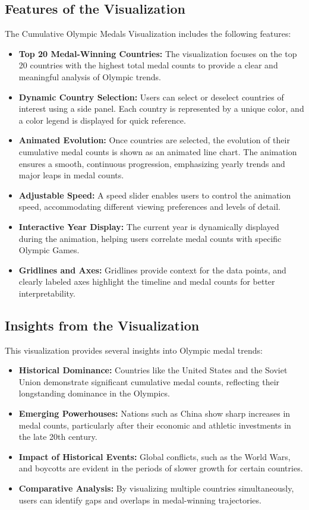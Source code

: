 \subsection{Features of the Visualization}
The Cumulative Olympic Medals Visualization includes the following features:
\begin{itemize}
    \item \textbf{Top 20 Medal-Winning Countries:} The visualization focuses on the top 20 countries with the highest total medal counts to provide a clear and meaningful analysis of Olympic trends.
    \item \textbf{Dynamic Country Selection:} Users can select or deselect countries of interest using a side panel. Each country is represented by a unique color, and a color legend is displayed for quick reference.
    \item \textbf{Animated Evolution:} Once countries are selected, the evolution of their cumulative medal counts is shown as an animated line chart. The animation ensures a smooth, continuous progression, emphasizing yearly trends and major leaps in medal counts.
    \item \textbf{Adjustable Speed:} A speed slider enables users to control the animation speed, accommodating different viewing preferences and levels of detail.
    \item \textbf{Interactive Year Display:} The current year is dynamically displayed during the animation, helping users correlate medal counts with specific Olympic Games.
    \item \textbf{Gridlines and Axes:} Gridlines provide context for the data points, and clearly labeled axes highlight the timeline and medal counts for better interpretability.
\end{itemize}

\subsection{Insights from the Visualization}
This visualization provides several insights into Olympic medal trends:
\begin{itemize}
    \item \textbf{Historical Dominance:} Countries like the United States and the Soviet Union demonstrate significant cumulative medal counts, reflecting their longstanding dominance in the Olympics.
    \item \textbf{Emerging Powerhouses:} Nations such as China show sharp increases in medal counts, particularly after their economic and athletic investments in the late 20th century.
    \item \textbf{Impact of Historical Events:} Global conflicts, such as the World Wars, and boycotts are evident in the periods of slower growth for certain countries.
    \item \textbf{Comparative Analysis:} By visualizing multiple countries simultaneously, users can identify gaps and overlaps in medal-winning trajectories.
\end{itemize}

